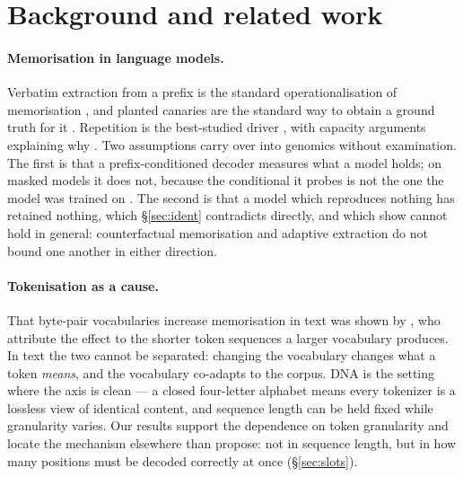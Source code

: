 \section{Background and related work}
\label{sec:related}

\paragraph{Memorisation in language models.}
Verbatim extraction from a prefix is the standard operationalisation of memorisation
\citep{carlini2023quantifying}, and planted canaries are the standard way to obtain a ground truth
for it \citep{jagielski2023canary}. Repetition is the best-studied driver
\citep{tirumala2022memorization}, with capacity arguments explaining why
\citep{morris2025capacity}. Two assumptions carry over into genomics without examination. The first
is that a prefix-conditioned decoder measures what a model holds; on masked models it does not,
because the conditional it probes is not the one the model was trained on
\citep{mireshghallah2022mlm,wang2026infilling}. The second is that a model which reproduces nothing
has retained nothing, which \S\ref{sec:ident} contradicts directly, and which
\citet{che2026memorization} show cannot hold in general: counterfactual memorisation and adaptive
extraction do not bound one another in either direction.

\paragraph{Tokenisation as a cause.}
That byte-pair vocabularies increase memorisation in text was shown by
\citet{kharitonov2021bpe}, who attribute the effect to the shorter token sequences a larger
vocabulary produces. In text the two cannot be separated: changing the vocabulary changes what a
token \emph{means}, and the vocabulary co-adapts to the corpus. DNA is the setting where the axis is
clean --- a closed four-letter alphabet means every tokenizer is a lossless view of identical
content, and sequence length can be held fixed while granularity varies. Our results support the
dependence on token granularity and locate the mechanism elsewhere than
\citet{kharitonov2021bpe} propose: not in sequence length, but in how many positions must be decoded
correctly at once (\S\ref{sec:slots}).

